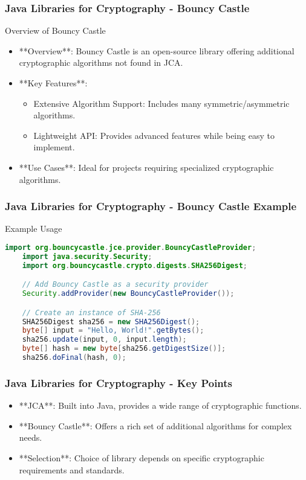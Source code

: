 \documentclass{beamer}
\begin{document}
\begin{frame}[fragile]
    \frametitle{Java Libraries for Cryptography - Bouncy Castle}
    \begin{block}{Overview of Bouncy Castle}
        \begin{itemize}
            \item **Overview**: Bouncy Castle is an open-source library offering additional cryptographic algorithms not found in JCA.
            \item **Key Features**:
                \begin{itemize}
                    \item Extensive Algorithm Support: Includes many symmetric/asymmetric algorithms.
                    \item Lightweight API: Provides advanced features while being easy to implement.
                \end{itemize}
            \item **Use Cases**: Ideal for projects requiring specialized cryptographic algorithms.
        \end{itemize}
    \end{block}
\end{frame}

\begin{frame}[fragile]
    \frametitle{Java Libraries for Cryptography - Bouncy Castle Example}
    \begin{block}{Example Usage}
    \begin{lstlisting}[language=Java]
    import org.bouncycastle.jce.provider.BouncyCastleProvider;
    import java.security.Security;
    import org.bouncycastle.crypto.digests.SHA256Digest;

    // Add Bouncy Castle as a security provider
    Security.addProvider(new BouncyCastleProvider());

    // Create an instance of SHA-256
    SHA256Digest sha256 = new SHA256Digest();
    byte[] input = "Hello, World!".getBytes();
    sha256.update(input, 0, input.length);
    byte[] hash = new byte[sha256.getDigestSize()];
    sha256.doFinal(hash, 0);
    \end{lstlisting}
    \end{block}
\end{frame}

\begin{frame}[fragile]
    \frametitle{Java Libraries for Cryptography - Key Points}
    \begin{itemize}
        \item **JCA**: Built into Java, provides a wide range of cryptographic functions.
        \item **Bouncy Castle**: Offers a rich set of additional algorithms for complex needs.
        \item **Selection**: Choice of library depends on specific cryptographic requirements and standards.
    \end{itemize}
\end{frame}
\end{document}
